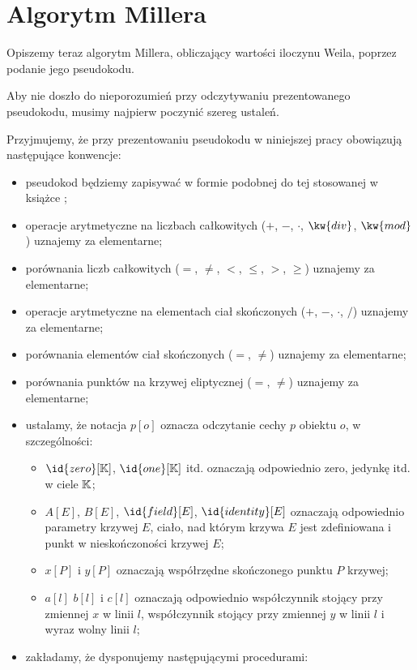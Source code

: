 \section{Algorytm Millera}

\noindent
Opiszemy teraz algorytm Millera,
obliczający wartości iloczynu Weila,
poprzez podanie jego pseudokodu.

\noindent
Aby nie doszło do nieporozumień przy odczytywaniu
prezentowanego pseudokodu,
musimy najpierw poczynić szereg ustaleń.

\begin{remark}
Przyjmujemy, że przy prezentowaniu pseudokodu w niniejszej pracy
obowiązują następujące konwencje:
\begin{itemize}
\item pseudokod będziemy zapisywać w formie podobnej do tej
stosowanej w książce \cite{clrs};
\item operacje arytmetyczne na liczbach całkowitych
($+$, $-$, $\cdot$, $\kw{div}$, $\kw{mod}$)
uznajemy za elementarne;
\item porównania liczb całkowitych
($=$, $\neq$, $<$, $\leq$, $>$, $\geq$)
uznajemy za elementarne;
\item operacje arytmetyczne na elementach ciał skończonych
($+$, $-$, $\cdot$, $/$)
uznajemy za elementarne;
\item porównania elementów ciał skończonych
($=$, $\neq$)
uznajemy za elementarne;
\item porównania punktów na krzywej eliptycznej
($=$, $\neq$)
uznajemy za elementarne;
\item ustalamy, że notacja $p[o]$ oznacza odczytanie cechy $p$ obiektu $o$,
w szczególności:
\begin{itemize}
\item $\id{zero}[\K]$, $\id{one}[\K]$ itd.
oznaczają odpowiednio
zero, jedynkę itd. w ciele $\mathbb{K}$;
\item $A[E]$, $B[E]$, $\id{field}[E]$, $\id{identity}[E]$
oznaczają odpowiednio
parametry krzywej $E$, ciało, nad którym krzywa $E$ jest zdefiniowana
i punkt w nieskończoności krzywej $E$;
\item $x[P]$ i $y[P]$ oznaczają współrzędne skończonego punktu $P$ krzywej;
\item $a[l]$ $b[l]$ i $c[l]$ oznaczają odpowiednio
współczynnik stojący przy zmiennej $x$ w linii $l$,
współczynnik stojący przy zmiennej $y$ w linii $l$
i wyraz wolny linii $l$;
\end{itemize}
\item zakładamy, że dysponujemy następującymi procedurami:

\end{itemize}
\end{remark}
